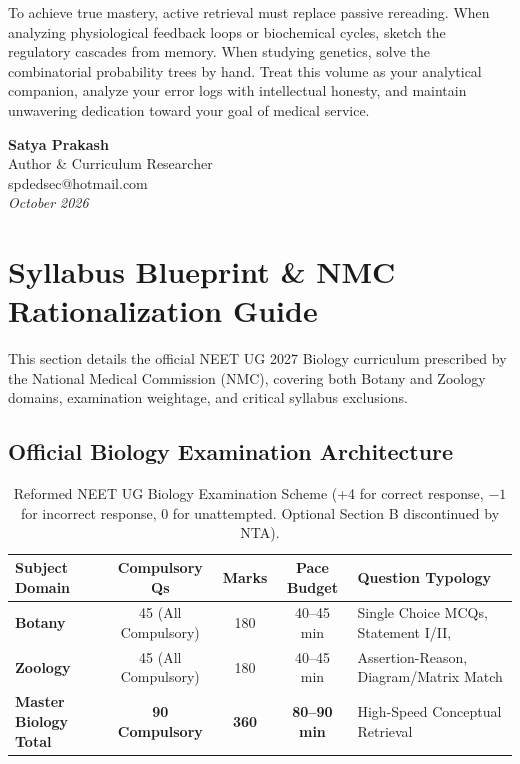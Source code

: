 \documentclass[10pt,twoside,openright]{book}
\begin{document}
To achieve true mastery, active retrieval must replace passive rereading. When analyzing physiological feedback loops or biochemical cycles, sketch the regulatory cascades from memory. When studying genetics, solve the combinatorial probability trees by hand. Treat this volume as your analytical companion, analyze your error logs with intellectual honesty, and maintain unwavering dedication toward your goal of medical service.

\vspace{1cm}
\begin{flushright}
  \textbf{Satya Prakash}\\
  Author \& Curriculum Researcher\\
  spdedsec@hotmail.com\\
  \textit{October 2026}
\end{flushright}
\cleardoublepage

\chapter*{Syllabus Blueprint \& NMC Rationalization Guide}

This section details the official NEET UG 2027 Biology curriculum prescribed by the National Medical Commission (NMC), covering both Botany and Zoology domains, examination weightage, and critical syllabus exclusions.

\section*{Official Biology Examination Architecture}

\begin{table}[htbp]
\centering
\footnotesize
\setlength{\tabcolsep}{2.5pt}
\renewcommand{\arraystretch}{1.2}
\begin{tabularx}{\textwidth}{l c c c Y}
\toprule
\textbf{Subject Domain} & \textbf{Compulsory Qs} & \textbf{Marks} & \textbf{Pace Budget} & \textbf{Question Typology} \\
\midrule
\textbf{Botany} & 45 (All Compulsory) & 180 & 40--45 min & Single Choice MCQs, Statement I/II, \\
\textbf{Zoology} & 45 (All Compulsory) & 180 & 40--45 min & Assertion-Reason, Diagram/Matrix Match \\
\midrule
\textbf{Master Biology Total} & \textbf{90 Compulsory} & \textbf{360} & \textbf{80--90 min} & High-Speed Conceptual Retrieval \\
\bottomrule
\end{tabularx}
\caption{Reformed NEET UG Biology Examination Scheme (+4 for correct response, $-1$ for incorrect response, 0 for unattempted. Optional Section B discontinued by NTA).}
\end{table}
\end{document}
